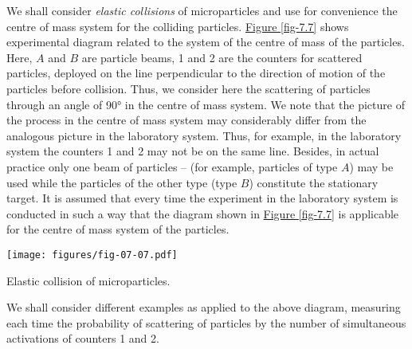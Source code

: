 \documentclass[a4paper,sfsidenotes,colorlinks=true]{tufte-book}
\numberwithin{equation}{section}
\numberwithin{figure}{section}
\begin{document}
We shall  consider \emph{elastic collisions} of microparticles and use for convenience the centre of mass system for the colliding particles. \hyperref[fig-7.7]{Figure \ref{fig-7.7}} shows experimental diagram related to the system of the centre of mass of the particles. Here, $A$ and $B$ are particle beams, \textsf{1} and \textsf{2} are the counters for scattered particles, deployed on the line perpendicular to the direction of motion of the particles before collision. Thus, we consider here the scattering of particles through an angle of \ang{90} in the centre of mass system. We note that the picture of the process in the centre of mass system may considerably differ from the analogous picture in the laboratory system. Thus, for example, in the laboratory system the counters \textsf{1} and \textsf{2} may not be on the same line. Besides, in actual practice only one beam of particles -- (for example, particles of type $A$) may be used while the particles of the other type (type $B$) constitute the stationary target. It is assumed that every time the experiment in the laboratory system is conducted in such a way that the diagram shown in \hyperref[fig-7.7]{Figure \ref{fig-7.7}} is applicable for the centre of mass system of the particles.

\begin{marginfigure}%
\centering
\texttt{[image: figures/fig-07-07.pdf]}
\caption{Elastic collision of microparticles.}
\label{fig-7.7}
\end{marginfigure}

We shall consider different examples as applied to the above diagram, measuring each time the probability of scattering of particles by the number of simultaneous activations of counters \textsf{1} and \textsf{2}.
\end{document}
